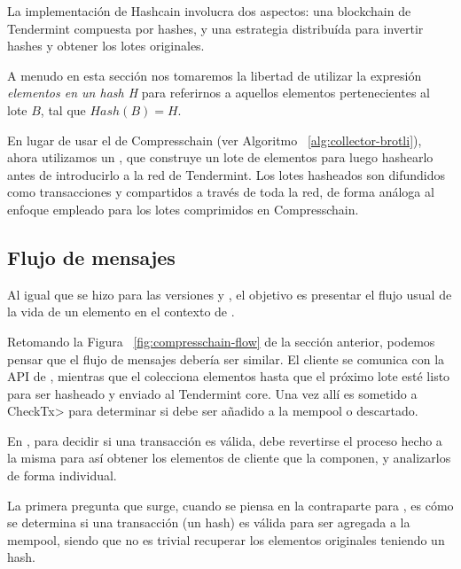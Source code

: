 La implementación de Hashcain involucra dos aspectos: una blockchain de Tendermint compuesta por hashes,
y una estrategia distribuída para invertir hashes y obtener los lotes originales.
%

A menudo en esta sección nos tomaremos la libertad de utilizar la expresión \textit{elementos en un hash H}
para referirnos a aquellos elementos pertenecientes al lote $B$, tal que $Hash(B) = H$.

En lugar de usar el \collector de Compresschain (ver Algoritmo ~\ref{alg:collector-brotli}),
ahora utilizamos un \hcollector, que construye un lote de elementos para luego hashearlo
antes de introducirlo a la red de Tendermint.
%
Los lotes hasheados son difundidos como transacciones y compartidos a través de toda la red, de forma
análoga al enfoque empleado para los lotes comprimidos en Compresschain.

\subsection{Flujo de mensajes}

Al igual que se hizo para las versiones \vanilla y \compresschain, el objetivo es presentar el flujo usual
de la vida de un elemento en el contexto de \hashchain.

%

Retomando la Figura ~\ref{fig:compresschain-flow} de la sección anterior, podemos pensar que el flujo de mensajes
debería ser similar. El cliente se comunica con la API de \setchain, mientras que el \hcollector colecciona elementos
hasta que el próximo lote esté listo para ser hasheado y enviado al Tendermint core.
Una vez allí es sometido a
\<CheckTx> para determinar si debe ser añadido a la mempool o descartado.

%

En \compresschain, para decidir si una transacción es válida, debe revertirse el proceso hecho a la misma para
así obtener los elementos de cliente que la componen, y analizarlos de forma individual.

%

La primera pregunta que surge, cuando se piensa en la contraparte para \hashchain, es cómo se determina si una
transacción (un hash) es válida para ser agregada a la mempool, siendo que no es trivial recuperar los
elementos originales teniendo un hash.

